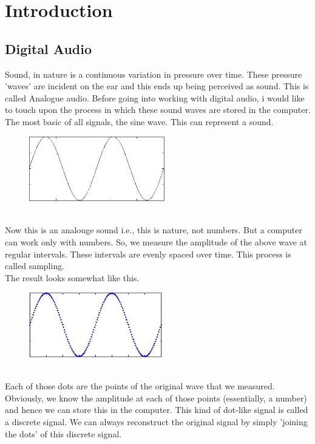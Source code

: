 \documentclass{article}
\begin{document}
\section*{Introduction}
\subsection*{Digital Audio}
Sound, in nature is a continuous variation in pressure over time. 
These pressure 'waves' are incident on the ear and this ends up being perceived 
as sound. This is called Analogue audio. Before going into working with digital 
audio, i would like to touch upon the process in which these sound waves are 
stored in the computer. The most basic of all signals, the sine wave. This can 
represent a sound.
\begin{figure}[h]
\begin{center}
\includegraphics[height=80pt]{../pictures/image1.jpg}
\end{center}
\end{figure}
\newline \\ Now this is an analouge sound i.e., this is nature, not numbers. But a computer 
can work only with numbers. So, we measure the amplitude of the above wave at 
regular intervals. These intervals are evenly spaced over time. This process is called sampling. 
\newline \\ The result looks somewhat like this.
\begin{figure}[h]
\begin{center}
\includegraphics[height=80pt]{../pictures/image2.jpg}
\end{center}
\end{figure}
\newline \\ Each of those dots are the points of the original wave that we measured. Obviously, 
we know the amplitude at each of those points (essentially, a number) and hence 
we can store this in the computer. This kind of dot-like signal is called a 
discrete signal. We can always reconstruct the original signal by simply 
'joining the dots' of this discrete signal.
\end{document}
